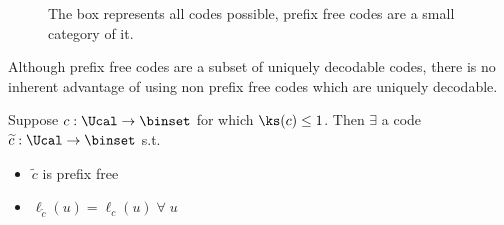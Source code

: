 \begin{figure}[h]
    \centering

    \caption{The box represents all codes possible, prefix free codes are a small category of it.}
\end{figure}
\begin{remark}
Although prefix free codes are a subset of uniquely decodable codes, there is no inherent advantage of using non prefix free codes which are uniquely decodable.
\end{remark}
\begin{theorem}
Suppose $c:\Ucal \to \binset$ for which $\ks(c) \leq 1$. Then $\exists$ a code $\widetilde{c}: \Ucal \to \binset$ s.t. 
\begin{itemize}
    \item $\widetilde{c}$ is prefix free
    \item $\ell_{\widetilde{c}}(u) = \ell_c(u) \;\forall \;u$
\end{itemize}
\end{theorem}
